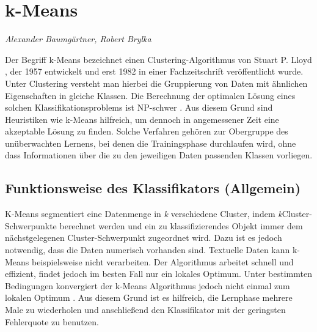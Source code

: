 \section{k-Means}
\textit{Alexander Baumgärtner, Robert Brylka}

Der Begriff k-Means bezeichnet einen Clustering-Algorithmus von Stuart P. Lloyd \cite{Lloyd}, der 1957 entwickelt und erst 1982 in einer Fachzeitschrift veröffentlicht wurde. Unter Clustering versteht man hierbei die Gruppierung von Daten mit ähnlichen Eigenschaften in gleiche Klassen. Die Berechnung der optimalen Lösung eines solchen Klassifikationsproblems ist NP-schwer \cite{kMeansNPhard}. Aus diesem Grund sind Heuristiken wie k-Means hilfreich, um dennoch in angemessener Zeit eine akzeptable Lösung zu finden.
Solche Verfahren gehören zur Obergruppe des unüberwachten Lernens, bei denen die Trainingsphase durchlaufen wird, ohne dass Informationen über die zu den jeweiligen Daten passenden Klassen vorliegen.



\subsection{Funktionsweise des Klassifikators (Allgemein)} \label{subsec:kMeansFunktionsweise}
K-Means segmentiert eine Datenmenge in \emph{k} verschiedene Cluster, indem \emph{k}Cluster-Schwerpunkte berechnet werden und ein zu klassifizierendes Objekt immer dem nächstgelegenen Cluster-Schwerpunkt zugeordnet wird. Dazu ist es jedoch notwendig, dass die Daten numerisch vorhanden sind. Textuelle Daten kann k-Means beispielsweise nicht verarbeiten.
Der Algorithmus arbeitet schnell und effizient, findet jedoch im besten Fall nur ein lokales Optimum. Unter bestimmten Bedingungen konvergiert der k-Means Algorithmus jedoch nicht einmal zum lokalen Optimum \cite{kMeansMinimum}. Aus diesem Grund ist es hilfreich, die Lernphase mehrere Male zu wiederholen und anschließend den Klassifikator mit der geringsten Fehlerquote zu benutzen.  

